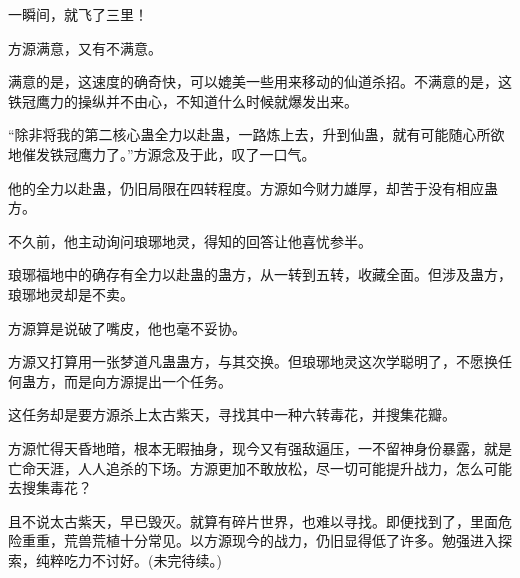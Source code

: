 \begin{this_body}
一瞬间，就飞了三里！

方源满意，又有不满意。

满意的是，这速度的确奇快，可以媲美一些用来移动的仙道杀招。不满意的是，这铁冠鹰力的操纵并不由心，不知道什么时候就爆发出来。

“除非将我的第二核心蛊全力以赴蛊，一路炼上去，升到仙蛊，就有可能随心所欲地催发铁冠鹰力了。”方源念及于此，叹了一口气。

他的全力以赴蛊，仍旧局限在四转程度。方源如今财力雄厚，却苦于没有相应蛊方。

不久前，他主动询问琅琊地灵，得知的回答让他喜忧参半。

琅琊福地中的确存有全力以赴蛊的蛊方，从一转到五转，收藏全面。但涉及蛊方，琅琊地灵却是不卖。

方源算是说破了嘴皮，他也毫不妥协。

方源又打算用一张梦道凡蛊蛊方，与其交换。但琅琊地灵这次学聪明了，不愿换任何蛊方，而是向方源提出一个任务。

这任务却是要方源杀上太古紫天，寻找其中一种六转毒花，并搜集花瓣。

方源忙得天昏地暗，根本无暇抽身，现今又有强敌逼压，一不留神身份暴露，就是亡命天涯，人人追杀的下场。方源更加不敢放松，尽一切可能提升战力，怎么可能去搜集毒花？

且不说太古紫天，早已毁灭。就算有碎片世界，也难以寻找。即便找到了，里面危险重重，荒兽荒植十分常见。以方源现今的战力，仍旧显得低了许多。勉强进入探索，纯粹吃力不讨好。(未完待续。)

\end{this_body}

